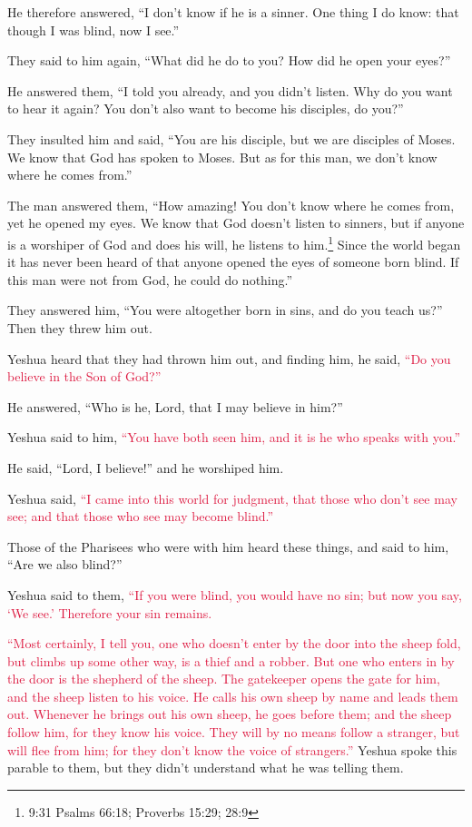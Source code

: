 \myverse{}He therefore answered, “I don’t know if he is a sinner. One thing
I do know: that though I was blind, now I see.”

\myverse{}They said to him again, “What did he do to you? How did he open
your eyes?”

\myverse{}He answered them, “I told you already, and you didn’t listen.
Why do you want to hear it again? You don’t also want to become his disciples, do you?”

\myverse{}They insulted him and said, “You are his disciple, but we are
disciples of Moses.
\myverse{}We know that God has spoken to Moses. But as for this man, we don’t know where
he comes from.”

\myverse{}The man answered them, “How amazing! You don’t know where he
comes from, yet he opened my eyes.
\myverse{}We know that God doesn’t listen to sinners, but if anyone is a worshiper of
God and does his will, he listens to him.\footnote{9:31 Psalms 66:18;
	Proverbs 15:29;
	28:9}
\myverse{}Since the world began it has never been heard of that anyone opened the eyes
of someone born blind.
\myverse{}If this man were not from God, he could do nothing.”

\myverse{}They answered him, “You were altogether born in sins, and do
you teach us?” Then they threw him out.

\myverse{}Yeshua heard that they had thrown him out, and finding him, he
said,
\textcolor{crimson}{“Do you believe in the Son of God?”}

\myverse{}He answered, “Who is he, Lord, that I may believe in him?”

\myverse{}Yeshua said to him,
\textcolor{crimson}{“You have both seen him, and it is he who speaks with you.”}

\myverse{}He said, “Lord, I believe!” and he worshiped him.

\myverse{}Yeshua said,
\textcolor{crimson}{“I came into this world for judgment, that those who don’t see may see; and that those who see may
	become blind.”}

\myverse{}Those of the Pharisees who were with him heard these things,
and said to him, “Are we also blind?”

\myverse{}Yeshua said to them,
\textcolor{crimson}{“If you were blind, you would have no sin; but now you say, ‘We see.’ Therefore your sin remains.}


\mychapter{} \myverse*{}\textcolor{crimson}{“Most certainly, I tell you, one who doesn’t enter by the
	door into the sheep fold, but climbs up some other way, is a thief and a robber.
}
\myverse{}\textcolor{crimson}{But one who enters in by the door is the shepherd of the sheep.
}
\myverse{}\textcolor{crimson}{The gatekeeper opens the gate for him, and the sheep listen to his voice.
	He calls his own sheep by name and leads them out.
}
\myverse{}\textcolor{crimson}{Whenever he brings out his own sheep, he goes before them; and the sheep
	follow him, for they know his voice.
}
\myverse{}\textcolor{crimson}{They will by no means follow a stranger, but will flee from him; for they
	don’t know the voice of strangers.”}
\myverse{}Yeshua spoke this parable to them, but they didn’t understand what he was telling
them.

